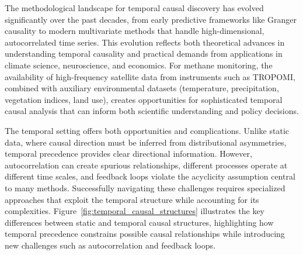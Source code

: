 The methodological landscape for temporal causal discovery has evolved significantly over the past decades, from early predictive frameworks like Granger causality to modern multivariate methods that handle high-dimensional, autocorrelated time series. This evolution reflects both theoretical advances in understanding temporal causality and practical demands from applications in climate science, neuroscience, and economics. For methane monitoring, the availability of high-frequency satellite data from instruments such as TROPOMI, combined with auxiliary environmental datasets (temperature, precipitation, vegetation indices, land use), creates opportunities for sophisticated temporal causal analysis that can inform both scientific understanding and policy decisions.

The temporal setting offers both opportunities and complications. Unlike static data, where causal direction must be inferred from distributional asymmetries, temporal precedence provides clear directional information. However, autocorrelation can create spurious relationships, different processes operate at different time scales, and feedback loops violate the acyclicity assumption central to many methods. Successfully navigating these challenges requires specialized approaches that exploit the temporal structure while accounting for its complexities. Figure~\ref{fig:temporal_causal_structures} illustrates the key differences between static and temporal causal structures, highlighting how temporal precedence constrains possible causal relationships while introducing new challenges such as autocorrelation and feedback loops.

